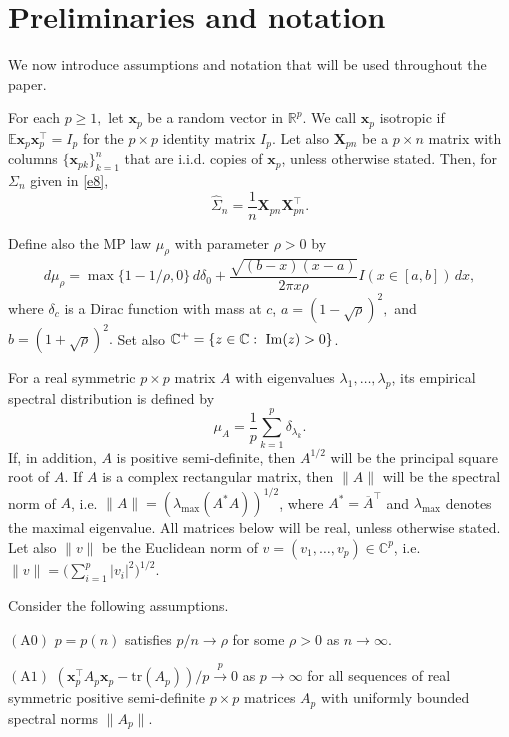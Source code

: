 \documentclass[12pt, a4paper]{article}
\newcommand\X{\mathbf X}
\newcommand\x{\mathbf x}
\renewcommand\Im{{\rm\,Im} }
\newcommand\bR{{\mathbb R}}
\newcommand\wh{\widehat }
\newcommand\pto{\stackrel p\rightarrow}
\newcommand\e{{\mathbb E}}
\newcommand\tr{{\mathrm{tr}}}
\begin{document}
\section{Preliminaries and notation}
We now introduce assumptions and notation that will be used throughout the paper.

 For each $p\geqslant 1,$ let $\x_p$ be a random vector in $\bR^p$.  We call $\x_p$  isotropic if $\e\x_p\x_p^\top=I_p$ for the $p\times p$ identity matrix $I_p$. Let also $ \X_{pn}$ be a $p\times n$ matrix with columns $\{\x_{pk}\}_{k=1}^n$ that are i.i.d. copies of $\x_p$, unless otherwise stated. Then, for $\Sigma_n$ given in \eqref{e8},
\[\wh\Sigma_n=\frac{1}{n}\X_{pn}\X_{pn}^\top.\]


Define also the MP law $\mu_\rho$ with parameter $\rho>0$ by 
\[d\mu_\rho=\max\{1-1/\rho,0\}\,d\delta_0+\frac{\sqrt{(b-x)(x-a)}}{2\pi x\rho   }I(x\in [a,b])\,dx, \]
where $\delta_c$ is a Dirac function with mass at $c$, $a=(1-\sqrt{\rho})^2,$ and $b=(1+\sqrt{\rho})^2.$ Set also  $\mathbb C^+=\{z\in\mathbb C:\,\Im(z)>0\}$.

For a real symmetric $p\times p$ matrix  $A$  with eigenvalues $\lambda_1,\ldots,\lambda_p$, its empirical spectral distribution  is defined by \[\mu_A=\frac{1}{p}\sum_{k=1}^p\delta_{\lambda_k}.\]
If, in addition, $A$ is  positive semi-definite, then $A^{1/2}$ will be the principal square root of $A$. If $A$  is a complex  rectangular  matrix, then $\|A\|$ will be the spectral norm of $A$, i.e. $\|A\|=(\lambda_{\max}(A^*A))^{1/2}$, where  $A^*=\overline{A}^\top$  and $\lambda_{\max}$ denotes the maximal eigenvalue. All matrices below will be real, unless otherwise stated. Let also  $\|v\|$ be the Euclidean norm of   $v=(v_1,\ldots,v_p)\in\mathbb C^p$, i.e. $\|v\|=\big(\sum_{i=1}^p|v_i|^2\big)^{1/2}.$ 

Consider the following assumptions.

$(\mathrm A0)$ $p=p(n)$ satisfies $p/n\to \rho$ for some $\rho>0$ as $n\to\infty$.

$(\mathrm A1)$  $(\x_p^\top A_p\x_p-\tr( A_p))/p\pto 0$ as $p\to\infty$ for all sequences of real symmetric positive semi-definite $p\times p$  matrices $A_p$ with uniformly bounded spectral norms $\|A_p\|$. 
\end{document}
